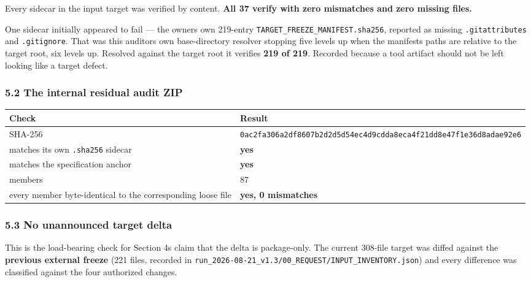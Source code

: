 \documentclass[
  9pt,
  a4paper,
]{article}
\newcounter{none} %
\begin{document}
Every sidecar in the input target was verified by content. \textbf{All
37 verify with zero mismatches and zero missing files.}

One sidecar initially appeared to fail --- the owner\textquotesingle s
own 219-entry \texttt{TARGET\_FREEZE\_MANIFEST.sha256}, reported as
missing \texttt{.gitattributes} and \texttt{.gitignore}. That was this
auditor\textquotesingle s own base-directory resolver stopping five
levels up when the manifest\textquotesingle s paths are relative to the
target root, six levels up. Resolved against the target root it verifies
\textbf{219 of 219}. Recorded because a tool artifact should not be left
looking like a target defect.

\subsubsection{5.2 The internal residual audit
ZIP}\label{52-the-internal-residual-audit-zip}

{\def\LTcaptype{none} %
\begin{longtable}[]{@{}ll@{}}
\toprule\noalign{}
Check & Result \\
\midrule\noalign{}
\endhead
\bottomrule\noalign{}
\endlastfoot
SHA-256 &
\texttt{0ac2fa306a2df8607b2d2d5d54ec4d9cdda8eca4f21dd8e47f1e36d8adae92e6} \\
matches its own \texttt{.sha256} sidecar & \textbf{yes} \\
matches the specification anchor & \textbf{yes} \\
members & 87 \\
every member byte-identical to the corresponding loose file &
\textbf{yes, 0 mismatches} \\
\end{longtable}
}

\subsubsection{5.3 No unannounced target
delta}\label{53-no-unannounced-target-delta}

This is the load-bearing check for Section 4\textquotesingle s claim
that the delta is package-only. The current 308-file target was diffed
against the \textbf{previous external freeze} (221 files, recorded in
\texttt{run\_2026-08-21\_v1.3/00\_REQUEST/INPUT\_INVENTORY.json}) and
every difference was classified against the four authorized changes.
\end{document}
